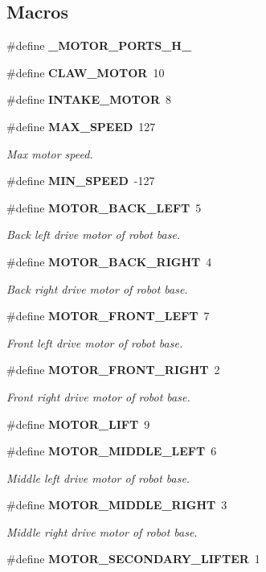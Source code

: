 \subsection*{Macros}
\begin{DoxyCompactItemize}
\item 
\#define \textbf{ \+\_\+\+M\+O\+T\+O\+R\+\_\+\+P\+O\+R\+T\+S\+\_\+\+H\+\_\+}
\item 
\#define \textbf{ C\+L\+A\+W\+\_\+\+M\+O\+T\+OR}~10
\item 
\#define \textbf{ I\+N\+T\+A\+K\+E\+\_\+\+M\+O\+T\+OR}~8
\item 
\#define \textbf{ M\+A\+X\+\_\+\+S\+P\+E\+ED}~127
\begin{DoxyCompactList}\small\item\em Max motor speed. \end{DoxyCompactList}\item 
\#define \textbf{ M\+I\+N\+\_\+\+S\+P\+E\+ED}~-\/127
\item 
\#define \textbf{ M\+O\+T\+O\+R\+\_\+\+B\+A\+C\+K\+\_\+\+L\+E\+FT}~5
\begin{DoxyCompactList}\small\item\em Back left drive motor of robot base. \end{DoxyCompactList}\item 
\#define \textbf{ M\+O\+T\+O\+R\+\_\+\+B\+A\+C\+K\+\_\+\+R\+I\+G\+HT}~4
\begin{DoxyCompactList}\small\item\em Back right drive motor of robot base. \end{DoxyCompactList}\item 
\#define \textbf{ M\+O\+T\+O\+R\+\_\+\+F\+R\+O\+N\+T\+\_\+\+L\+E\+FT}~7
\begin{DoxyCompactList}\small\item\em Front left drive motor of robot base. \end{DoxyCompactList}\item 
\#define \textbf{ M\+O\+T\+O\+R\+\_\+\+F\+R\+O\+N\+T\+\_\+\+R\+I\+G\+HT}~2
\begin{DoxyCompactList}\small\item\em Front right drive motor of robot base. \end{DoxyCompactList}\item 
\#define \textbf{ M\+O\+T\+O\+R\+\_\+\+L\+I\+FT}~9
\item 
\#define \textbf{ M\+O\+T\+O\+R\+\_\+\+M\+I\+D\+D\+L\+E\+\_\+\+L\+E\+FT}~6
\begin{DoxyCompactList}\small\item\em Middle left drive motor of robot base. \end{DoxyCompactList}\item 
\#define \textbf{ M\+O\+T\+O\+R\+\_\+\+M\+I\+D\+D\+L\+E\+\_\+\+R\+I\+G\+HT}~3
\begin{DoxyCompactList}\small\item\em Middle right drive motor of robot base. \end{DoxyCompactList}\item 
\#define \textbf{ M\+O\+T\+O\+R\+\_\+\+S\+E\+C\+O\+N\+D\+A\+R\+Y\+\_\+\+L\+I\+F\+T\+ER}~1
\end{DoxyCompactItemize}


